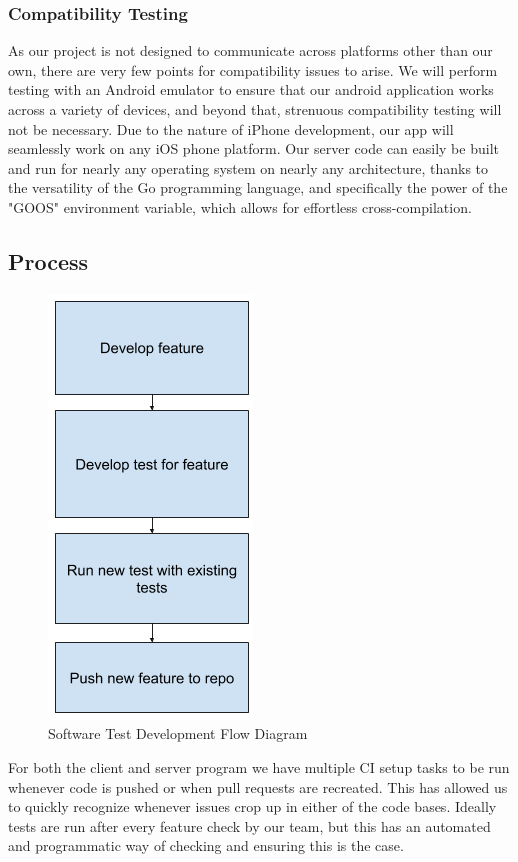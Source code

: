 \documentclass[11pt]{article}
\begin{document}
\subsubsection*{Compatibility Testing}
As our project is not designed to communicate across platforms other than our own, there are very few points for compatibility issues to arise. We will perform testing with an Android emulator to ensure that our android application works across a variety of devices, and beyond that, strenuous compatibility testing will not be necessary. Due to the nature of iPhone development, our app will seamlessly work on any iOS phone platform. Our server code can easily be built and run for nearly any operating system on nearly any architecture, thanks to the versatility of the Go programming language, and specifically the power of the "GOOS" environment variable, which allows for effortless cross-compilation.

\subsection{Process}

\begin{figure}[h!]
  \centerline{\includegraphics{testFlowchart.png}}
  \caption{Software Test Development Flow Diagram}
  \label{fig:flow_diag}
\end{figure}

For both the client and server program we have multiple CI setup tasks to be run whenever code is pushed or when pull requests are recreated. This has allowed us to quickly recognize whenever issues crop up in either of the code bases.  Ideally tests are run after every feature check by our team, but this has an automated and programmatic way of checking and ensuring this is the case.
\end{document}

